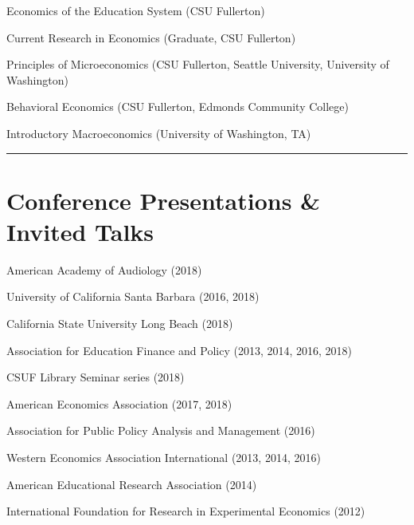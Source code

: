\documentclass[11pt,a4paper]{article}
\begin{document}
Economics of the Education System (CSU Fullerton)



Current Research in Economics (Graduate, CSU Fullerton)



Principles of Microeconomics (CSU Fullerton, Seattle University, University of Washington)



Behavioral Economics (CSU Fullerton, Edmonds Community College)



Introductory Macroeconomics (University of Washington, TA)



\vspace{1cm} \hrule \vspace{1cm}





\section*{Conference Presentations \& Invited Talks} 



American Academy of Audiology (2018)



University of California Santa Barbara (2016, 2018)



California State University Long Beach (2018)



Association for Education Finance and Policy (2013, 2014, 2016, 2018)



CSUF Library Seminar series (2018)



American Economics Association (2017, 2018)



Association for Public Policy Analysis and Management (2016)



Western Economics Association International (2013, 2014, 2016)



American Educational Research Association (2014)



International Foundation for Research in Experimental Economics (2012)
\end{document}
